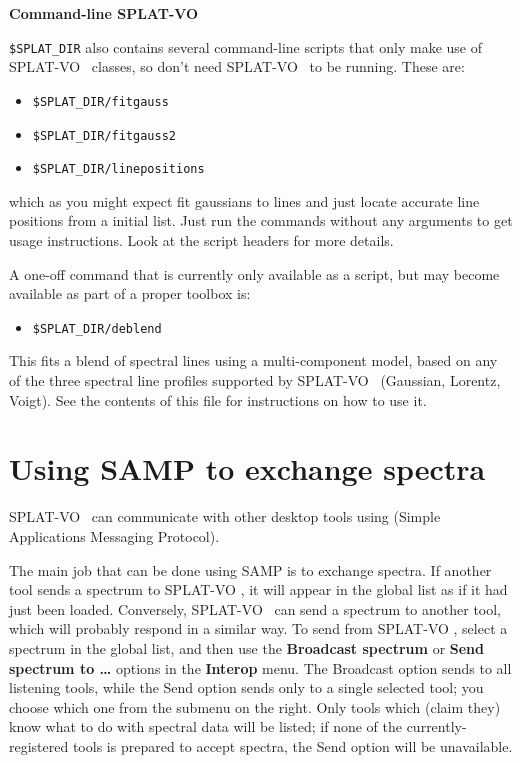 \documentclass[twoside,11pt,nolof]{starlink}
\providecommand{\SPLAT}{\textsf{SPLAT-VO }}
\renewcommand{\menuitem}[1]{\textbf{#1}}
\providecommand{\hitext}[1]{\texttt{#1}}
\providecommand{\subheading}[1]{\textbf{\large{#1}}}
\begin{document}
\subheading{Command-line \SPLAT}

\hitext{\$SPLAT\_DIR} also contains several command-line scripts that
only make use of \SPLAT\ classes, so don't need \SPLAT\ to be running. These
are:
\begin{itemize}
\item \hitext{\$SPLAT\_DIR/fitgauss}
\item \hitext{\$SPLAT\_DIR/fitgauss2}
\item \hitext{\$SPLAT\_DIR/linepositions}
\end{itemize}
which as you might expect fit gaussians to lines and just locate
accurate line positions from a initial list. Just run the commands
without any arguments to get usage instructions. Look at the script
headers for more details.

A one-off command that is currently only available as a script, but may become
available as part of a proper toolbox is:
\begin{itemize}
\item \hitext{\$SPLAT\_DIR/deblend}
\end{itemize}
This fits a blend of spectral lines using a multi-component model, based on
any of the three spectral line profiles supported by \SPLAT\ (Gaussian,
Lorentz, Voigt). See the contents of this file for instructions on how to use
it.

\newpage
\section{Using SAMP to exchange spectra\label{interop}}

\SPLAT\ can communicate with other desktop tools using
(Simple Applications Messaging Protocol).

The main job that can be done using SAMP is to exchange spectra.  If another
tool sends a spectrum to \SPLAT, it will appear in the global list as if it
had just been loaded.  Conversely, \SPLAT\ can send a spectrum to another
tool, which will probably respond in a similar way.  To send from \SPLAT,
select a spectrum in the global list, and then use the \menuitem{Broadcast
  spectrum} or \menuitem{Send spectrum to \ldots} options in the
\menuitem{Interop} menu.  The Broadcast option sends to all listening tools,
while the Send option sends only to a single selected tool; you choose which
one from the submenu on the right.  Only tools which (claim they) know what to
do with spectral data will be listed; if none of the currently-registered
tools is prepared to accept spectra, the Send option will be unavailable.
\end{document}
